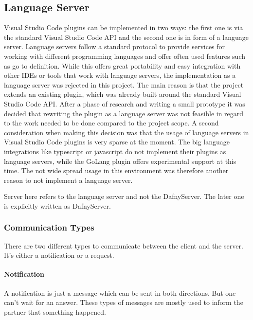 \subsection{Language Server}

Visual Studio Code plugins can be implemented in two ways: the first one is via the standard Visual Studio Code API and the second one is in form of a language server. Language servers follow a standard protocol to provide services for working with different programming languages and offer often used features such as go to definition. While this offers great portability and easy integration with other IDEs or tools that work with language servers, the implementation as a language server was rejected in this project. \newline
The main reason is that the project extends an existing plugin, which was already built around the standard Visual Studio Code API. After a phase of research and writing a small prototype it was decided that rewriting the plugin as a language server was not feasible in regard to the work needed to be done compared to the project scope. \newline
A second consideration when making this decision was that the usage of language servers in Visual Studio Code plugins is very sparse at the moment. The big language integrations like typescript or javascript do not implement their plugins as language servers, while the GoLang plugin offers experimental support at this time. The not wide spread usage in this environment was therefore another reason to not implement a language server.


Server here refers to the language server and not the DafnyServer. The later one is explicitly written as DafnyServer.

\subsubsection{Communication Types}
There are two different types to communicate between the client and the server. It's either a notification or a request. 

\paragraph{Notification}
A notification is just a message which can be sent in both directions. But one can't wait for an answer. These types of messages are mostly used to inform the partner that something happened. 

